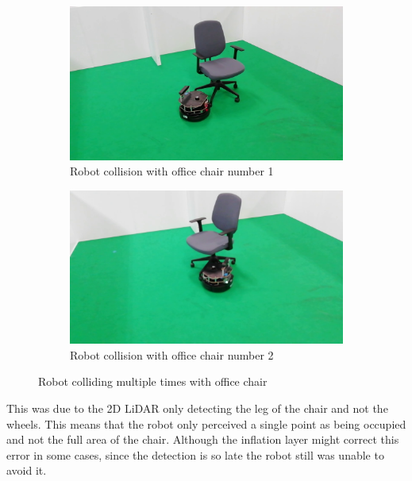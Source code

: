 \begin{figure}[h!]
  \centering
  \begin{subfigure}[b]{0.49\linewidth}
    \includegraphics[width=\linewidth]{imgs/chapter5/wchairLF.png}
     \caption{Robot collision with office chair number 1}
     \label{fig::wchairLF1}
  \end{subfigure}
  \begin{subfigure}[b]{0.49\linewidth}
    \includegraphics[width=\linewidth]{imgs/chapter5/wchairLF2.png}
    \caption{Robot collision with office chair number 2}
    \label{fig::wchairLF2}
  \end{subfigure}
  \caption{Robot colliding multiple times with office chair}
  \label{fig:wchairLF}
\end{figure}






This was due to the 2D \ac{LiDAR} only detecting the leg of the chair and not the wheels. This means that the robot only perceived a single point as being occupied and not the full area of the chair. Although the inflation layer  might correct this error in some cases, since the detection is so late the robot still was unable to avoid it.

